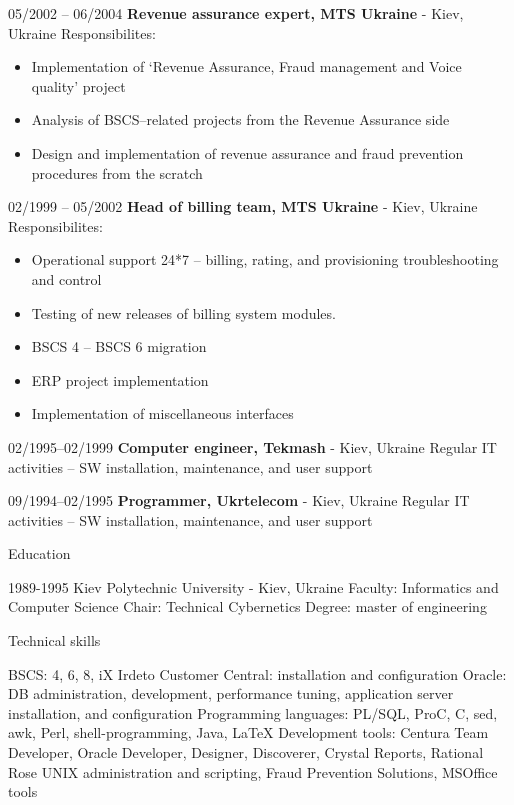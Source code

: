 \documentclass[10pt,a4paper]{extbook}
\begin{document}
05/2002 – 06/2004 \hspace{10mm} \textbf{Revenue assurance expert, MTS Ukraine} \hspace{10mm} - Kiev, Ukraine
Responsibilites:
\begin{itemize}
	\item Implementation of ‘Revenue Assurance, Fraud management and Voice quality’ project
	\item Analysis of BSCS–related projects from the Revenue Assurance side
	\item Design and implementation of revenue assurance and fraud prevention procedures from the scratch
\end{itemize}

02/1999 – 05/2002 \hspace{10mm} \textbf{Head of billing team, MTS Ukraine} \hspace{10mm} - Kiev, Ukraine
Responsibilites:
\begin{itemize}
	\item Operational support 24*7 – billing, rating, and provisioning troubleshooting and control
	\item Testing of new releases of billing system modules.
	\item BSCS 4 – BSCS 6 migration 
	\item ERP project implementation
	\item Implementation of miscellaneous interfaces
\end{itemize}

02/1995–02/1999 \hspace{10mm} \textbf{Computer engineer, Tekmash} \hspace{10mm} - Kiev, Ukraine
Regular IT activities – SW installation, maintenance, and user support

09/1994–02/1995	\hspace{10mm} \textbf{Programmer, Ukrtelecom} \hspace{10mm} - Kiev, Ukraine
Regular IT activities – SW installation, maintenance, and user support

Education

1989-1995
Kiev Polytechnic University - Kiev, Ukraine
Faculty: Informatics and Computer Science
Chair: Technical Cybernetics
Degree: master of engineering

Technical skills

BSCS: 4, 6, 8, iX
Irdeto Customer Central: installation and configuration
Oracle: DB administration, development, performance tuning, application server installation, and configuration
Programming languages: PL/SQL, ProC, C, sed, awk, Perl, shell-programming, Java, LaTeX
Development tools: Centura Team Developer, Oracle Developer, Designer, Discoverer, Crystal Reports, Rational Rose
UNIX administration and scripting, Fraud Prevention Solutions, MSOffice tools
\end{document}
